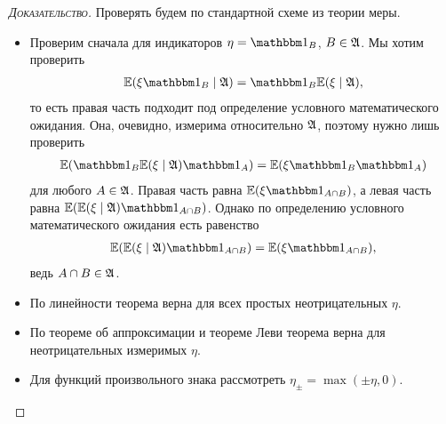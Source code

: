 \documentclass[../main.tex]{subfiles}
\begin{document}
\begin{proof}[\normalfont\textsc{Доказательство}]
 Проверять будем по стандартной схеме из теории меры.
 \begin{itemize}
  \item Проверим сначала для индикаторов $ \eta = \Ind_B $, $ B \in \mathfrak A $. Мы хотим проверить
   \begin{align*}
    \E(\xi\Ind_B \mid \A) = \Ind_B \E(\xi \mid \A),
   \end{align*} то есть правая часть подходит под определение условного математического ожидания. Она, очевидно, измерима относительно $ \mathfrak A $, поэтому нужно лишь проверить
   \begin{align*}
    \E(\Ind_B \E(\xi\mid\A)\Ind_A) = \E(\xi\Ind_B\Ind_A)
   \end{align*} для любого $ A\in\mathfrak A $. Правая часть равна $ \E(\xi\Ind_{A \cap B}) $, а левая часть равна $ \E(\E(\xi \mid \A)\Ind_{A\cap B}) $. Однако по определению условного математического ожидания есть равенство
   \begin{align*}
    \E(\E(\xi \mid \A)\Ind_{A\cap B}) = \E(\xi\Ind_{A\cap B}),
   \end{align*} ведь $ A \cap B \in \mathfrak A $.
  \item По линейности теорема верна для всех простых неотрицательных $ \eta $.
  \item По теореме об аппроксимации и теореме Леви теорема верна для неотрицательных измеримых $ \eta $.
  \item Для функций произвольного знака рассмотреть $ \eta_\pm  =\max(\pm \eta, 0) $.
 \end{itemize}
\end{proof}
\end{document}
